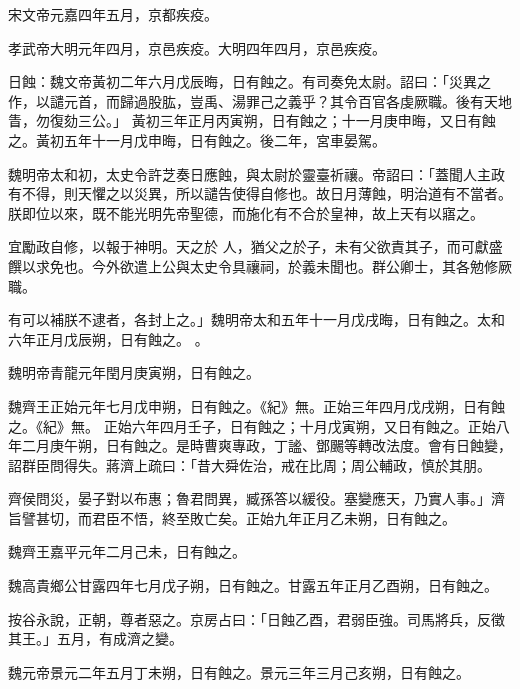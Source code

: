 \begin{pinyinscope}
 宋文帝元嘉四年五月，京都疾疫。



 孝武帝大明元年四月，京邑疾疫。大明四年四月，京邑疾疫。



 日蝕：魏文帝黃初二年六月戊辰晦，日有蝕之。有司奏免太尉。詔曰：「災異之作，以譴元首，而歸過股肱，豈禹、湯罪己之義乎？其令百官各虔厥職。後有天地眚，勿復劾三公。」
 黃初三年正月丙寅朔，日有蝕之；十一月庚申晦，又日有蝕之。黃初五年十一月戊申晦，日有蝕之。後二年，宮車晏駕。



 魏明帝太和初，太史令許芝奏日應蝕，與太尉於靈臺祈禳。帝詔曰：「蓋聞人主政有不得，則天懼之以災異，所以譴告使得自修也。故日月薄蝕，明治道有不當者。朕即位以來，既不能光明先帝聖德，而施化有不合於皇神，故上天有以寤之。



 宜勵政自修，以報于神明。天之於
 人，猶父之於子，未有父欲責其子，而可獻盛饌以求免也。今外欲遣上公與太史令具禳祠，於義未聞也。群公卿士，其各勉修厥職。


有可以補朕不逮者，各封上之。」魏明帝太和五年十一月戊戌晦，日有蝕之。太和六年正月戊辰朔，日有蝕之。
 。



 魏明帝青龍元年閏月庚寅朔，日有蝕之。



 魏齊王正始元年七月戊申朔，日有蝕之。《紀》無。正始三年四月戊戌朔，日有蝕之。《紀》無。
 正始六年四月壬子，日有蝕之；十月戊寅朔，又日有蝕之。正始八年二月庚午朔，日有蝕之。是時曹爽專政，丁謐、鄧颺等轉改法度。會有日蝕變，詔群臣問得失。蔣濟上疏曰：「昔大舜佐治，戒在比周；周公輔政，慎於其朋。



 齊侯問災，晏子對以布惠；魯君問異，臧孫答以緩役。塞變應天，乃實人事。」濟旨譬甚切，而君臣不悟，終至敗亡矣。正始九年正月乙未朔，日有蝕之。



 魏齊王嘉平元年二月己未，日有蝕之。



 魏高貴鄉公甘露四年七月戊子朔，日有蝕之。甘露五年正月乙酉朔，日有蝕之。



 按谷永說，正朝，尊者惡之。京房占曰：「日蝕乙酉，君弱臣強。司馬將兵，反徵其王。」五月，有成濟之變。



 魏元帝景元二年五月丁未朔，日有蝕之。景元三年三月己亥朔，日有蝕之。




\end{pinyinscope}
